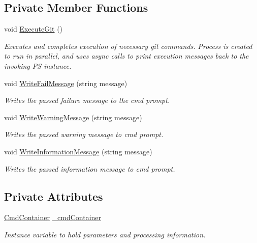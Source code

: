 \subsection*{Private Member Functions}
\begin{DoxyCompactItemize}
\item 
void \mbox{\hyperlink{class_get_repo_cmdlet_1_1_get_repo_cmdlet_a6d4524a1c3d700585b10ba0f0a6ec157}{Execute\+Git}} ()
\begin{DoxyCompactList}\small\item\em Executes and completes execution of necessary git commands. Process is created to run in parallel, and uses async calls to print execution messages back to the invoking PS instance. \end{DoxyCompactList}\item 
void \mbox{\hyperlink{class_get_repo_cmdlet_1_1_get_repo_cmdlet_afe285942efc86534f71f64c78fbb2445}{Write\+Fail\+Message}} (string message)
\begin{DoxyCompactList}\small\item\em Writes the passed failure message to the cmd prompt. \end{DoxyCompactList}\item 
void \mbox{\hyperlink{class_get_repo_cmdlet_1_1_get_repo_cmdlet_abd3278e2a9e0b1a3ac95dfee3eeb6bdc}{Write\+Warning\+Message}} (string message)
\begin{DoxyCompactList}\small\item\em Writes the passed warning message to cmd prompt. \end{DoxyCompactList}\item 
void \mbox{\hyperlink{class_get_repo_cmdlet_1_1_get_repo_cmdlet_aabc925069bb0855f2cd1e07ae832b44a}{Write\+Information\+Message}} (string message)
\begin{DoxyCompactList}\small\item\em Writes the passed information message to cmd prompt. \end{DoxyCompactList}\end{DoxyCompactItemize}
\subsection*{Private Attributes}
\begin{DoxyCompactItemize}
\item 
\mbox{\hyperlink{class_get_repo_cmdlet_1_1_cmd_container}{Cmd\+Container}} \mbox{\hyperlink{class_get_repo_cmdlet_1_1_get_repo_cmdlet_a822f61308706124cb1f17d9cd1af1092}{\+\_\+cmd\+Container}}
\begin{DoxyCompactList}\small\item\em Instance variable to hold parameters and processing information. \end{DoxyCompactList}\end{DoxyCompactItemize}


